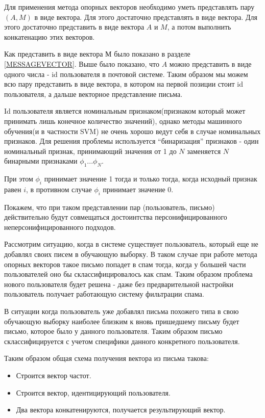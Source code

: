 Для применения метода опорных векторов необходимо уметь представлять пару $(A, M)$ в виде вектора. Для этого достаточно представлять в виде вектора. Для этого достаточно представить в виде вектора $A$ и $M$, а потом выполнить конкатенацию этих векторов.

Как представить в виде вектора $М$ было показано в разделе \ref{MESSAGEVECTOR}. Выше было показано, что $A$ можно представить в виде одного числа - id пользователя в почтовой системе. Таким образом мы можем всю пару представить в виде вектора, в котором на первой позиции стоит id пользователя, а дальше векторное представление письма. 

Id пользователя является номинальным признаком(признаком который может принимать лишь конечное количество значений), однако методы машинного обучения(и в частности SVM\cite{YURYSVM}) не очень хорошо ведут себя в случае номинальных признаков.
Для решения проблемы используется ``бинаризация'' признаков - один номинальный признак, принимающий значения от 1 до $N$ заменяется $N$ бинарными признаками $\phi_1 ... \phi_N$. 

При этом $\phi_i$ принимает значение 1 тогда и только тогда, когда исходный признак равен $i$, в противном случае $\phi_i$ принимает значение 0.

Покажем, что при таком представлении пар (пользователь, письмо) действительно будут совмещаться достоинтства персонифицированного неперсонифицированного подходов. 

Рассмотрим ситуацию, когда в системе существует пользователь, который еще не добавлял своих писем в обучающую выборку. В таком случае при работе метода опорных векторов такое письмо попадет в спам тогда, когда у большей части пользователей оно бы склассифицировалось как спам. Таким образом проблема нового пользователя будет решена - даже без предварительной настройки пользователь получает работающую систему фильтрации спама.

В ситуации когда пользователь уже добавлял письма похожего типа в свою обучающую выборку наиболее близким к вновь пришедшему письму будет письмо, которое было у данного пользователя. Таким образом письмо склассифицируется с учетом специфики данного конкретного пользователя.

Таким образом общая схема получения вектора из письма такова:
\begin{itemize}
	\item Строится вектор частот.
	\item Строится вектор, идентицирующий пользователя.
	\item Два вектора конкатенируются, получается результирующий вектор.
\end{itemize}

